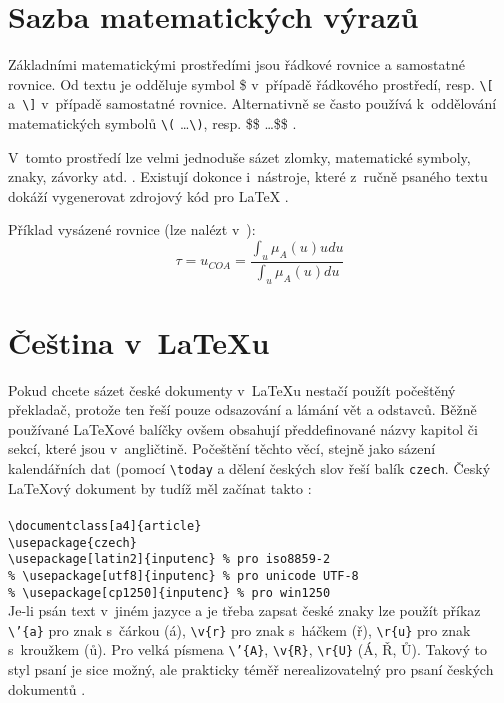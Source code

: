 \documentclass[a4paper, 11pt]{article}
\begin{document}
\section{Sazba matematických výrazů}
    Základními matematickými prostředími jsou řádkové rovnice a samostatné rovnice. Od textu je odděluje symbol \$ v~případě řádkového prostředí, resp. \verb|\[ | a\verb| \]| v~případě samostatné rovnice. Alternativně se často používá k~oddělování matematických symbolů \verb|\(| \dots \verb|\)|, resp. \$\$ \dots \$\$ \cite{Kalvoda2015}.
    
    \noindent V~tomto prostředí lze velmi jednoduše sázet zlomky, matematické symboly, znaky, závorky atd. \cite{Olsak2014}. Existují dokonce i~nástroje, které z~ručně psaného textu dokáží vygenerovat zdrojový kód pro {\LaTeX} \cite{Oksuz2008}.

    Příklad vysázené rovnice (lze nalézt v~\cite{CazarezCastro2012}):
    $$\tau = u_{COA} = \frac{\int_{u}^{}\mu_{A}(u)udu}{\int_{u}^{}\mu_{A}(u)du}$$

\section{Čeština v~{\LaTeX}u}
    Pokud chcete sázet české dokumenty v~{\LaTeX}u nestačí použít počeštěný překladač, protože ten řeší pouze odsazování a lámání vět a odstavců. Běžně používané {\LaTeX}ové balíčky ovšem obsahují předdefinované názvy kapitol či sekcí, které jsou v~angličtině. Počeštění těchto věcí, stejně jako sázení kalendářních dat (pomocí \verb|\today| a dělení českých slov řeší balík \verb|czech|. Český {\LaTeX}ový dokument by tudíž měl začínat takto \cite{Martinek2008}: 
    \\ \\ 
    \noindent \verb|\documentclass[a4]{article}| \\
    \verb|\usepackage{czech}| \\
    \verb|\usepackage[latin2]{inputenc} % pro iso8859-2| \\
    \verb|% \usepackage[utf8]{inputenc} % pro unicode UTF-8| \\
    \verb|% \usepackage[cp1250]{inputenc} % pro win1250| \\
    
    \noindent Je-li psán text v~jiném jazyce a je třeba zapsat české znaky lze použít příkaz \verb|\’{a}| pro znak s~čárkou (á), \verb|\v{r}| pro znak s~háčkem (ř), \verb|\r{u}| pro znak s~kroužkem (ů). Pro velká písmena \verb|\’{A}|, \verb|\v{R}|, \verb|\r{U}| (Á, Ř, Ů). Takový to styl psaní je sice možný, ale prakticky téměř nerealizovatelný pro psaní českých dokumentů \cite{Bojko2011}.

\newpage


\renewcommand{\refname}{Literatura}

\end{document}
